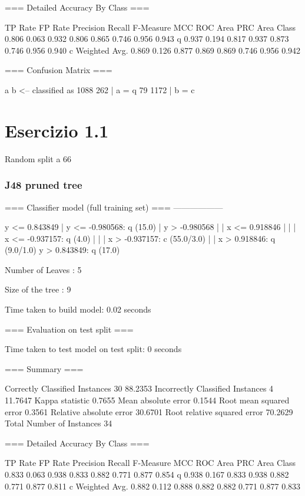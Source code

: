 \documentclass{report}
\begin{document}
	=== Detailed Accuracy By Class ===
	
	TP Rate  FP Rate  Precision  Recall   F-Measure  MCC      ROC Area  PRC Area  Class
	0.806    0.063    0.932      0.806    0.865      0.746    0.956     0.943     q
	0.937    0.194    0.817      0.937    0.873      0.746    0.956     0.940     c
	Weighted Avg.    0.869    0.126    0.877      0.869    0.869      0.746    0.956     0.942     
	
	=== Confusion Matrix ===
	
	a    b   <-- classified as
	1088  262 |    a = q
	79 1172 |    b = c
	
	\part{Esercizio 1.1}
	Random split a 66%

	\section{J48 pruned tree}
	=== Classifier model (full training set) ===
	------------------
	
	y <= 0.843849
	|   y <= -0.980568: q (15.0)
	|   y > -0.980568
	|   |   x <= 0.918846
	|   |   |   x <= -0.937157: q (4.0)
	|   |   |   x > -0.937157: c (55.0/3.0)
	|   |   x > 0.918846: q (9.0/1.0)
	y > 0.843849: q (17.0)
	
	Number of Leaves  : 	5
	
	Size of the tree : 	9
	
	
	Time taken to build model: 0.02 seconds
	
	=== Evaluation on test split ===
	
	Time taken to test model on test split: 0 seconds
	
	=== Summary ===
	
	Correctly Classified Instances          30               88.2353 %
	Incorrectly Classified Instances         4               11.7647 %
	Kappa statistic                          0.7655
	Mean absolute error                      0.1544
	Root mean squared error                  0.3561
	Relative absolute error                 30.6701 %
	Root relative squared error             70.2629 %
	Total Number of Instances               34     
	
	=== Detailed Accuracy By Class ===
	
	TP Rate  FP Rate  Precision  Recall   F-Measure  MCC      ROC Area  PRC Area  Class
	0.833    0.063    0.938      0.833    0.882      0.771    0.877     0.854     q
	0.938    0.167    0.833      0.938    0.882      0.771    0.877     0.811     c
	Weighted Avg.    0.882    0.112    0.888      0.882    0.882      0.771    0.877     0.833     
	
\end{document}
